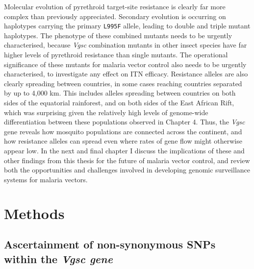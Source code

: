 \documentclass[a4paper,11pt,abstracton,hidelinks]{scrartcl}
\begin{document}
Molecular evolution of pyrethroid target-site resistance is clearly far more complex than previously appreciated.
%
Secondary evolution is occurring on haplotypes carrying the primary \texttt{L995F} allele, leading to double and triple mutant haplotypes.
%
The phenotype of these combined mutants needs to be urgently characterised, because \textit{Vgsc} combination mutants in other insect species have far higher levels of pyrethroid resistance than single mutants.
%
The operational significance of these mutants for malaria vector control also needs to be urgently characterised, to investigate any effect on ITN efficacy.
%
Resistance alleles are also clearly spreading between countries, in some cases reaching countries separated by up to 4,000 km.
%
This includes alleles spreading between countries on both sides of the equatorial rainforest, and on both sides of the East African Rift, which was surprising given the relatively high levels of genome-wide differentiation between these populations observed in Chapter 4.
%
Thus, the \textit{Vgsc} gene reveals how mosquito populations are connected across the continent, and how resistance alleles can spread even where rates of gene flow might otherwise appear low.
%
In the next and final chapter I discuss the implications of these and other findings from this thesis for the future of malaria vector control, and review both the opportunities and challenges involved in developing genomic surveillance systems for malaria vectors.


\section{Methods}\label{sec:methods}


\subsection{Ascertainment of non-synonymous SNPs within the \textit{Vgsc gene}}\label{subsec:methods-asc}
\end{document}
